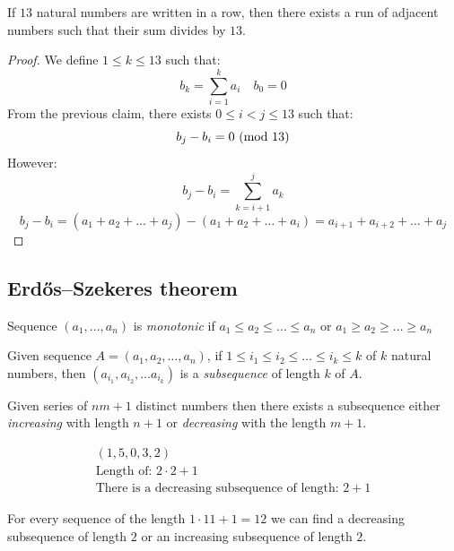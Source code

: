 \documentclass[00_complete]{subfiles}
\begin{document}
\begin{claim}
    If $13$ natural numbers are written in a row, then there exists a run of
    adjacent numbers such that their sum divides by $13$.
\end{claim}
\begin{proof}
    We define $1\leq k \leq 13$ such that:
    $$b_k=\sum_{i=1}^{k}a_i \quad b_{0}=0$$
    From the previous claim, there exists $0 \leq i<j \leq 13$ such that:
    $$b_j-b_i=0\ (\mathrm{mod}\ 13)$$
    However:
    $$b_j-b_i = \sum_{k=i+1}^{j}a_k$$
    $$b_j-b_i=(a_1+a_2+\dots+a_j)-(a_1+a_2+\dots+a_i)=a_{i+1}+a_{i+2}+ \dots + a_j$$
\end{proof}
\subsection{Erd\H{o}s–Szekeres theorem}
\begin{definition}
    Sequence $(a_1,\dots,a_n)$ is \emph{monotonic} if $a_1 \leq a_2 \leq \dots
    \leq a_n$ or $a_1 \geq a_2 \geq \dots \geq a_n$

    Given sequence $A=(a_1,a_2,\dots,a_n)$, if $1 \leq i_1 \leq i_2 \leq \dots
    \leq i_k \leq k$ of $k$ natural numbers, then $(a_{i_1}, a_{i_2}, \dots
    a_{i_k})$ is a \emph{subsequence} of length $k$ of $A$.

    Given series of $nm+1$ distinct numbers then there exists a subsequence
    either \emph{increasing} with length $n+1$ or \emph{decreasing} with the
    length $m+1$.
\end{definition}
\begin{example}
    \begin{gather*}
        (1,5,0,3,2) \\
        \text{Length of: } 2 \cdot 2 + 1 \\
        \text{There is a decreasing subsequence of length: } 2+1
    \end{gather*}
\end{example}
\begin{conclusion}
    For every sequence of the length $1\cdot 11 + 1 = 12$ we can find a
    decreasing subsequence of length $2$ or an increasing subsequence of length
    $2$.
\end{conclusion}
\end{document}
